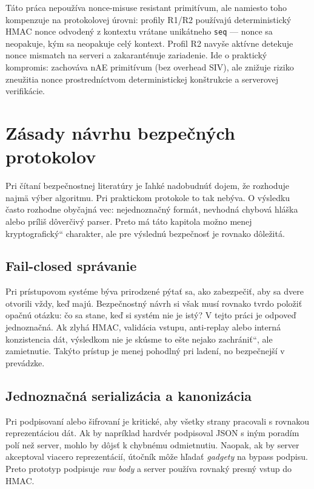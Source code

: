 \documentclass[journal,a4paper,onecolumn]{IEEEtran}
\newcommand{\uv}[1]{\quotedblbase#1\textquotedblleft}
\begin{document}
Táto práca nepoužíva nonce-misuse resistant primitívum, ale namiesto toho kompenzuje na protokolovej úrovni: profily R1/R2 používajú deterministický HMAC nonce odvodený z kontextu vrátane unikátneho \texttt{seq} --- nonce sa neopakuje, kým sa neopakuje celý kontext. Profil R2 navyše aktívne detekuje nonce mismatch na serveri a zakaranténuje zariadenie. Ide o praktický kompromis: zachováva nAE primitívum (bez overhead SIV), ale znižuje riziko zneužitia nonce prostredníctvom deterministickej konštrukcie a serverovej verifikácie\cite{RogawayNonceMisuse2004,BellareNonceMisuse2006}.



\section{Zásady návrhu bezpečných protokolov}

Pri čítaní bezpečnostnej literatúry je ľahké nadobudnúť dojem, že rozhoduje najmä výber algoritmu. Pri praktickom protokole to tak nebýva. O výsledku často rozhodne obyčajná vec: nejednoznačný formát, nevhodná chybová hláška alebo príliš dôverčivý parser. Preto má táto kapitola možno menej \uv{kryptografický} charakter, ale pre výslednú bezpečnosť je rovnako dôležitá.

\subsection{Fail-closed správanie}

Pri prístupovom systéme býva prirodzené pýtať sa, ako zabezpečiť, aby sa dvere otvorili vždy, keď majú. Bezpečnostný návrh si však musí rovnako tvrdo položiť opačnú otázku: čo sa stane, keď si systém nie je istý? V tejto práci je odpoveď jednoznačná. Ak zlyhá HMAC, validácia vstupu, anti-replay alebo interná konzistencia dát, výsledkom nie je \uv{skúsme to ešte nejako zachrániť}, ale zamietnutie. Takýto prístup je menej pohodlný pri ladení, no bezpečnejší v prevádzke.

\subsection{Jednoznačná serializácia a kanonizácia}

Pri podpisovaní alebo šifrovaní je kritické, aby všetky strany pracovali s rovnakou reprezentáciou dát. Ak by napríklad hardvér podpisoval JSON s iným poradím polí než server, mohlo by dôjsť k chybnému odmietnutiu. Naopak, ak by server akceptoval viacero reprezentácií, útočník môže hľadať \emph{gadgety} na bypass podpisu. Preto prototyp podpisuje \emph{raw body} a server používa rovnaký presný vstup do HMAC.
\end{document}
